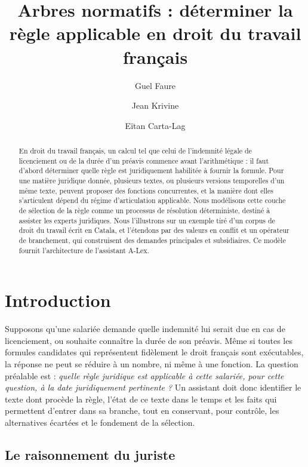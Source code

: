 \documentclass[review]{jflart}
\title{Arbres normatifs : déterminer la règle applicable en droit du travail
  français}
\author[1,2]{Guel Faure}
\author[2]{Jean Krivine}
\author[1,3]{Eïtan Carta-Lag}
\affil[1]{LUMO (SARL), Grenoble, France}
\affil[2]{Université Paris Cité, CNRS, IRIF, F-75013, Paris, France}
\affil[3]{Acquis De Droit (cabinet d'avocats), Grenoble, France}
\begin{document}
\maketitle

\begin{abstract}
  En droit du travail français, un calcul tel que celui de l'indemnité légale
  de licenciement ou de la durée d'un préavis commence avant l'arithmétique :
  il faut d'abord déterminer quelle règle est juridiquement habilitée à fournir
  la formule. Pour une matière juridique donnée, plusieurs textes, ou plusieurs
  versions temporelles d'un même texte, peuvent proposer des fonctions
  concurrentes, et la manière dont elles s'articulent dépend du régime
  d'articulation applicable. Nous modélisons cette couche de sélection de la
  règle comme un processus de résolution déterministe, destiné à assister les
  experts juridiques. Nous l'illustrons sur un exemple tiré d'un corpus de droit
  du travail écrit en Catala, et l'étendons par des valeurs en conflit et un
  opérateur de branchement, qui construisent des demandes principales et
  subsidiaires. Ce
  modèle fournit l'architecture de l'assistant A-Lex.
\end{abstract}

\section{Introduction}\label{sec:introduction}

Supposons qu'une salariée demande quelle indemnité lui serait due en cas de
licenciement, ou souhaite connaître la durée de son préavis. Même si toutes les
formules candidates qui représentent fidèlement le droit français sont
exécutables, la réponse ne peut se réduire à un nombre, ni même à une fonction.
La question préalable est : \emph{quelle règle juridique est applicable à cette
salariée, pour cette question, à la date juridiquement pertinente ?} Un
assistant doit donc identifier le texte dont procède la règle, l'état de ce
texte dans le temps et les faits qui permettent d'entrer dans sa branche, tout
en conservant, pour contrôle, les alternatives écartées et le fondement de la
sélection.

\subsection{Le raisonnement du juriste} \label{sec:juriste}
\end{document}
